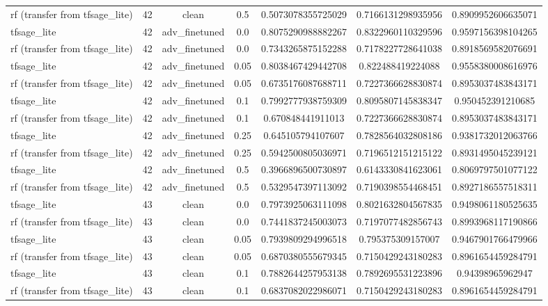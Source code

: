 \begin{table}[htbp]
\begin{tabular}{lcccccc}
rf (transfer from tfsage\_lite) & 42 & clean & 0.5 & 0.5073078355725029 & 0.7166131298935956 & 0.8909952606635071 \\
tfsage\_lite & 42 & adv\_finetuned & 0.0 & 0.8075290988882267 & 0.8322960110329596 & 0.9597156398104265 \\
rf (transfer from tfsage\_lite) & 42 & adv\_finetuned & 0.0 & 0.7343265875152288 & 0.7178227728641038 & 0.8918569582076691 \\
tfsage\_lite & 42 & adv\_finetuned & 0.05 & 0.8038467429442708 & 0.822488419224088 & 0.9558380008616976 \\
rf (transfer from tfsage\_lite) & 42 & adv\_finetuned & 0.05 & 0.6735176087688711 & 0.7227366628830874 & 0.8953037483843171 \\
tfsage\_lite & 42 & adv\_finetuned & 0.1 & 0.7992777938759309 & 0.8095807145838347 & 0.950452391210685 \\
rf (transfer from tfsage\_lite) & 42 & adv\_finetuned & 0.1 & 0.670848441911013 & 0.7227366628830874 & 0.8953037483843171 \\
tfsage\_lite & 42 & adv\_finetuned & 0.25 & 0.645105794107607 & 0.7828564032808186 & 0.9381732012063766 \\
rf (transfer from tfsage\_lite) & 42 & adv\_finetuned & 0.25 & 0.5942500805036971 & 0.7196512151215122 & 0.8931495045239121 \\
tfsage\_lite & 42 & adv\_finetuned & 0.5 & 0.3966896500730897 & 0.6143330841623061 & 0.8069797501077122 \\
rf (transfer from tfsage\_lite) & 42 & adv\_finetuned & 0.5 & 0.5329547397113092 & 0.7190398554468451 & 0.8927186557518311 \\
tfsage\_lite & 43 & clean & 0.0 & 0.7973925063111098 & 0.8021632804567835 & 0.9498061180525635 \\
rf (transfer from tfsage\_lite) & 43 & clean & 0.0 & 0.7441837245003073 & 0.7197077482856743 & 0.8993968117190866 \\
tfsage\_lite & 43 & clean & 0.05 & 0.7939809294996518 & 0.795375309157007 & 0.9467901766479966 \\
rf (transfer from tfsage\_lite) & 43 & clean & 0.05 & 0.6870380555679345 & 0.7150429243180283 & 0.8961654459284791 \\
tfsage\_lite & 43 & clean & 0.1 & 0.7882644257953138 & 0.7892695531223896 & 0.94398965962947 \\
rf (transfer from tfsage\_lite) & 43 & clean & 0.1 & 0.6837082022986071 & 0.7150429243180283 & 0.8961654459284791 \\

\end{tabular}
\end{table}
